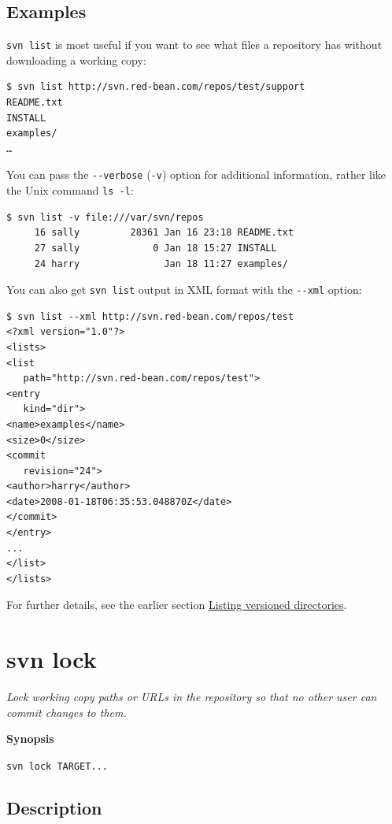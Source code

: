 \subsection{Examples}

\texttt{svn\ list} is most useful if you want to see what files a
repository has without downloading a working copy:

\begin{verbatim}
$ svn list http://svn.red-bean.com/repos/test/support
README.txt
INSTALL
examples/
…
\end{verbatim}

You can pass the \texttt{-\/-verbose} (\texttt{-v}) option for
additional information, rather like the Unix command \texttt{ls\ -l}:

\begin{verbatim}
$ svn list -v file:///var/svn/repos
     16 sally         28361 Jan 16 23:18 README.txt
     27 sally             0 Jan 18 15:27 INSTALL
     24 harry               Jan 18 11:27 examples/
\end{verbatim}

You can also get \texttt{svn\ list} output in XML format with the
\texttt{-\/-xml} option:

\begin{verbatim}
$ svn list --xml http://svn.red-bean.com/repos/test
<?xml version="1.0"?>
<lists>
<list
   path="http://svn.red-bean.com/repos/test">
<entry
   kind="dir">
<name>examples</name>
<size>0</size>
<commit
   revision="24">
<author>harry</author>
<date>2008-01-18T06:35:53.048870Z</date>
</commit>
</entry>
...
</list>
</lists>
\end{verbatim}

For further details, see the earlier section
\hyperref[svn.tour.history.browsing.list]{Listing versioned
directories}.

\section{svn lock}\label{svn.ref.svn.c.lock}

\emph{Lock working copy paths or URLs in the repository so that no other
user can commit changes to them.}

\textbf{Synopsis}

\texttt{svn\ lock\ TARGET...}

\subsection{Description}

